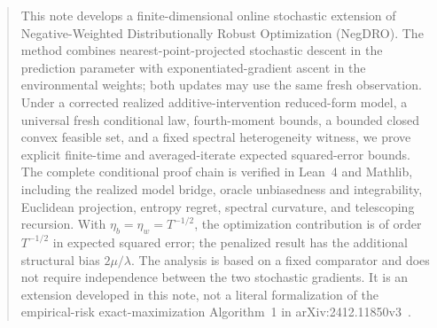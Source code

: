 \begin{abstract}
This note develops a finite-dimensional online stochastic extension of
Negative-Weighted Distributionally Robust Optimization (NegDRO).  The method
combines nearest-point-projected stochastic descent in the prediction
parameter with exponentiated-gradient ascent in the environmental weights;
both updates may use the same fresh observation.  Under a corrected realized
additive-intervention reduced-form model, a universal fresh conditional law,
fourth-moment bounds, a bounded closed convex feasible set, and a fixed
spectral heterogeneity witness, we prove explicit finite-time and
averaged-iterate expected squared-error bounds.  The complete conditional
proof chain is verified in Lean~4 and Mathlib, including the realized model
bridge, oracle unbiasedness and integrability, Euclidean projection, entropy
regret, spectral curvature, and telescoping recursion.  With
$\eta_b=\eta_w=T^{-1/2}$, the optimization contribution is of order
$T^{-1/2}$ in expected squared error; the penalized result has the additional
structural bias $2\mu/\lambda$.  The analysis is based on a fixed comparator
and does not require independence between the two stochastic gradients.  It
is an extension developed in this note, not a literal formalization of the
empirical-risk exact-maximization Algorithm~1 in
arXiv:2412.11850v3~\cite{wang2026negdro}.
\end{abstract}
